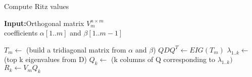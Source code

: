 \begin{algorithm}
\caption{Compute Ritz values}
{\bf Input:}Orthogonal matrix $V^{n\times m}_{m}$\\
coefficients $\alpha[1..m]$ and $\beta[1..m-1]$
\begin{algorithmic}[1]
\STATE $T_{m} \leftarrow$ (build a tridiagonal matrix from $\alpha$ and $\beta$)
\STATE $QDQ^{T} \leftarrow EIG(T_{m})$
\STATE $\lambda_{1..k} \leftarrow$ (top k eigenvalues from D)
\STATE $Q_{k} \leftarrow $ (k columns of Q corresponding to $\lambda_{1..k})$
\STATE $R_{k} \leftarrow V_{m}Q_{k}$
\end{algorithmic}
\label{eigen:algo3}
\end{algorithm}

